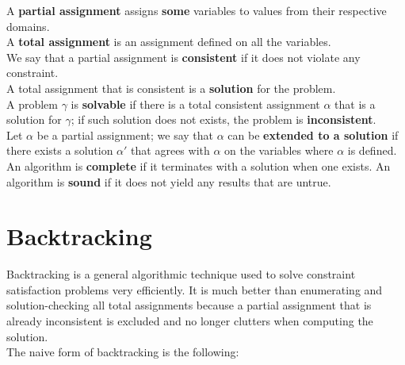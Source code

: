 \documentclass{article}
\begin{document}
A \textbf{partial assignment} assigns \textbf{some} variables to values from their respective domains. \\
A \textbf{total assignment} is an assignment defined on all the variables. \\
We say that a partial assignment is \textbf{consistent} if it does not violate any constraint.\\
A total assignment that is consistent is a \textbf{solution} for the problem.\\
A problem $\gamma$ is \textbf{solvable} if there is a total consistent assignment $\alpha$ that is a solution for $\gamma$; if such solution does not exists, the problem is \textbf{inconsistent}.\\
Let $\alpha$ be a partial assignment; we say that $\alpha$ can be \textbf{extended to a solution} if there exists a solution $\alpha'$ that agrees with $\alpha$ on the variables where $\alpha$ is defined. \\

An algorithm is \textbf{complete} if it terminates with a solution when one exists.
An algorithm is \textbf{sound} if it does not yield any results that are untrue.

\section{Backtracking}

Backtracking is a general algorithmic technique used to solve constraint satisfaction problems very efficiently. It is much better than enumerating and solution-checking all total assignments because a partial assignment that is already inconsistent is excluded and no longer clutters when computing the solution. \\

The naive form of backtracking is the following:
\end{document}
